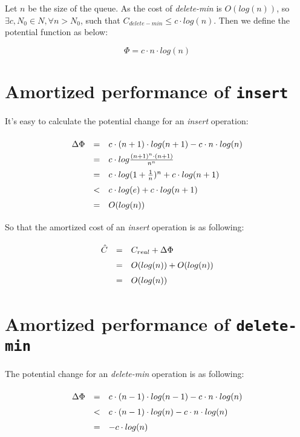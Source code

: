 Let $n$ be the size of the queue. As the cost of \textit{delete-min} is $O(log(n))$, so $\exists c, N_0 \in N, \forall n > N_0$, such that $C_{delete-min} \leq c \cdot log(n)$. Then we define the potential function as below:

\[
\Phi = c \cdot n \cdot log(n)
\]

\section{Amortized performance of \texttt{insert}}

It's easy to calculate the potential change for an \textit{insert} operation:

\[
\def\arraystretch{1.5}
\begin{array}{lcl}
  \Delta \Phi & = & c \cdot (n + 1) \cdot log(n + 1) - c \cdot n \cdot log(n) \\
              & = & c \cdot log\frac{(n + 1)^n \cdot (n + 1)}{n^n} \\
              & = & c \cdot log(1 + \frac{1}{n})^n + c \cdot log(n + 1) \\
              & < & c \cdot log(e) + c \cdot log(n + 1) \\
              & = & O(log(n))
\end{array}
\]

So that the amortized cost of an \textit{insert} operation is as following:

\[
\def\arraystretch{1.5}
\begin{array}{lcl}
\hat C & = & C_{real} + \Delta \Phi \\
       & = & O(log(n)) + O(log(n)) \\
       & = & O(log(n))
\end{array}
\]

\section{Amortized performance of \texttt{delete-min}}

The potential change for an \textit{delete-min} operation is as following:

\[
\def\arraystretch{1.5}
\begin{array}{lcl}
  \Delta \Phi & = & c \cdot (n - 1) \cdot log(n - 1) - c \cdot n \cdot log(n) \\
              & < & c \cdot (n - 1) \cdot log(n) - c \cdot n \cdot log(n) \\
              & = & - c \cdot log(n)
\end{array}
\]


